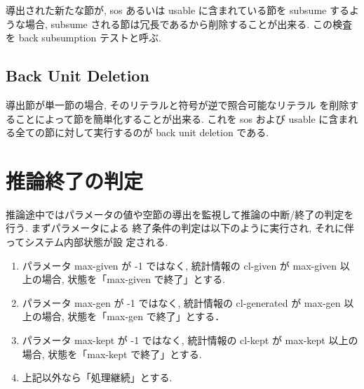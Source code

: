 導出された新たな節が, sos あるいは usable に含まれている節を subsume 
するような場合, subsume される節は冗長であるから削除することが出来る.
この検査を back subsumption テストと呼ぶ.

\subsection{Back Unit Deletion}
\label{sec:back-unit-deletion}

導出節が単一節の場合, そのリテラルと符号が逆で照合可能なリテラル
を削除することによって節を簡単化することが出来る. 
これを sos および usable に含まれる全ての節に対して実行するのが
back unit deletion である.

\section{推論終了の判定}
\label{sec:ending-process}

推論途中ではパラメータの値や空節の導出を監視して推論の中断/終了の判定を
行う. 
まずパラメータによる
終了条件の判定は以下のように実行され, それに伴ってシステム内部状態が設
定される.
\begin{enumerate}
\item パラメータ max-given が -1 ではなく, 統計情報の cl-given が
  max-given 以上の場合, 状態を「max-given で終了」とする.
\item パラメータ max-gen が -1 ではなく, 統計情報の cl-generated が
  max-gen 以上の場合, 状態を「max-gen で終了」とする．
\item パラメータ max-kept が -1 ではなく, 統計情報の cl-kept が
  max-kept 以上の場合, 状態を「max-kept で終了」とする.
\item 上記以外なら「処理継続」とする.
\end{enumerate}

